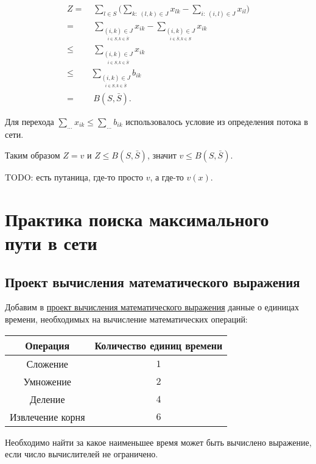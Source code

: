 \begin{align*}
	Z =& \; \sum_{l \in S} \bigg(\sum_{k:\;(l, k) \in J} x_{lk} - \sum_{i: \; (i, l) \in J} x_{il}\bigg) \\
	=& \;  \sum_{\underset{i \in S, k \in \bar{S}}{(i, k) \in J}} x_{ik} - \sum_{\underset{i \in \bar{S}, k \in S}{(i, k) \in J}} x_{ik} \\
	\le& \; \sum_{\underset{i \in S, k \in \bar{S}}{(i, k) \in J}} x_{ik} \\
	\le& \sum_{\underset{i \in S, k \in \bar{S}}{(i, k) \in J}} b_{ik} \\
	=& \; B(S, \bar{S}).
\end{align*}

Для перехода $\sum_{\dots}x_{ik} \le \sum_{\dots} b_{ik}$ использовалось условие из определения потока в сети.

Таким образом $Z = v$ и $Z \le B(S, \bar{S})$, значит $v \le B(S, \bar{S})$.

TODO: есть путаница, где-то просто $v$, а где-то $v(x)$.


\bigskip
\section{Практика поиска максимального пути в сети}
\subsection{Проект вычисления математического выражения}

Добавим в \hyperref[proj:math_expr_calc_project]{проект вычисления математического выражения} данные о единицах времени, необходимых на вычисление математических операций:

\begin{table}[H]
	\centering
	\begin{tabular}{ | c | c | } 
		\hline
		Операция & Количество единиц времени \\ \hline
		Сложение & $1$ \\ \hline
		Умножение & $2$ \\ \hline
		Деление & $4$ \\ \hline
		Извлечение корня & $6$ \\ \hline
	\end{tabular}
\end{table}

Необходимо найти за какое наименьшее время может быть вычислено выражение, если число вычислителей не ограничено.

